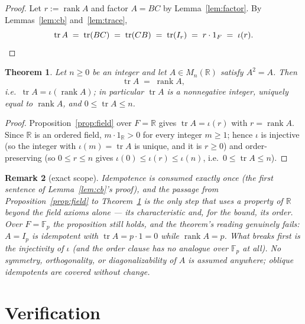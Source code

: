 \documentclass[11pt]{article}
\newtheorem{theorem}{Theorem}
\newtheorem{remark}[theorem]{Remark}
\begin{document}
\begin{proof}
Let $r := \operatorname{rank} A$ and factor $A = BC$ by Lemma~\ref{lem:factor}. By
Lemmas~\ref{lem:cb} and~\ref{lem:trace},
\[
  \operatorname{tr} A
  \;=\; \operatorname{tr}(BC)
  \;=\; \operatorname{tr}(CB)
  \;=\; \operatorname{tr}(I_r)
  \;=\; r\cdot 1_F
  \;=\; \iota(r). \qedhere
\]
\end{proof}

\begin{theorem}\label{thm:main}
Let $n \ge 0$ be an integer and let $A \in M_n(\mathbb{R})$ satisfy $A^2 = A$. Then
\[
  \operatorname{tr} A \;=\; \operatorname{rank} A ,
\]
i.e.\ $\operatorname{tr} A = \iota(\operatorname{rank} A)$; in particular
$\operatorname{tr} A$ is a nonnegative integer, uniquely equal to
$\operatorname{rank} A$, and $0 \le \operatorname{tr} A \le n$.
\end{theorem}

\begin{proof}
Proposition~\ref{prop:field} over $F = \mathbb{R}$ gives
$\operatorname{tr} A = \iota(r)$ with $r = \operatorname{rank} A$. Since $\mathbb{R}$
is an ordered field, $m \cdot 1_\mathbb{R} > 0$ for every integer $m \ge 1$; hence
$\iota$ is injective (so the integer with $\iota(m) = \operatorname{tr} A$ is unique,
and it is $r \ge 0$) and order-preserving (so $0 \le r \le n$ gives
$\iota(0) \le \iota(r) \le \iota(n)$, i.e.\ $0 \le \operatorname{tr} A \le n$).
\end{proof}

\begin{remark}[exact scope]\label{rem:scope}
Idempotence is consumed exactly once (the first sentence of Lemma~\ref{lem:cb}'s
proof), and the passage from Proposition~\ref{prop:field} to Theorem~\ref{thm:main}
is the only step that uses a property of $\mathbb{R}$ beyond the field axioms
alone --- its characteristic and, for the bound, its order. Over $F = \mathbb{F}_p$ the
proposition still holds, and the theorem's reading genuinely fails: $A = I_p$ is
idempotent with $\operatorname{tr} A = p \cdot 1 = 0$ while
$\operatorname{rank} A = p$. What breaks first is the injectivity of $\iota$ (and the order clause has no
analogue over $\mathbb{F}_p$ at all).
No symmetry, orthogonality, or diagonalizability of $A$ is assumed anywhere; oblique
idempotents are covered without change.
\end{remark}

\section{Verification}\label{sec:verification}
\end{document}
